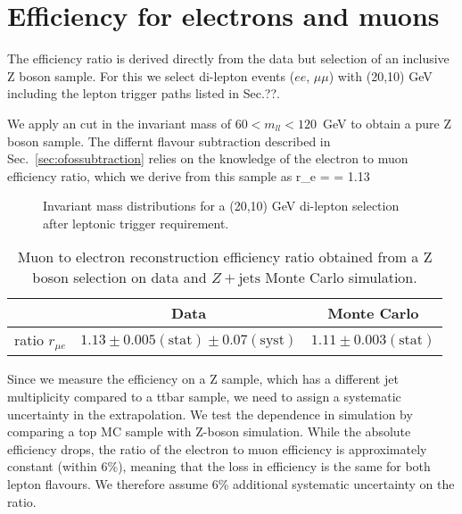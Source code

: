 \section{Efficiency for electrons and muons}\label{sec:eff}

The efficiency ratio is derived directly from the data
but selection of an inclusive Z boson sample.
For this we select di-lepton events ($ee$, $\mu\mu$) 
with (20,10) GeV including the lepton trigger paths
listed in Sec.??.

We apply an cut in the invariant mass of $60 < m_{ll} < 120$~GeV
to obtain a pure Z boson sample. The differnt flavour subtraction 
described in Sec.~\ref{sec:ofossubtraction} relies on the 
knowledge of the electron to muon efficiency ratio, which
we derive from this sample as
\be
    r_{\mu e} =  = 1.13 
\ee

\begin{figure}[hbtp]

  \hfill
  \hfill
  \caption{Invariant mass distributions for a (20,10) GeV di-lepton selection after leptonic 
      trigger requirement.\label{fig:Z_InvMass}}
\end{figure}


\begin{table}[htbp]
\begin{center}
\caption{\label{tab:tnp_eff}Muon to electron reconstruction efficiency ratio 
    obtained from a Z boson selection on data and $Z+\textrm{jets}$ Monte Carlo simulation.} 
\begin{tabular}{lcc}
\hline
            &  Data                                                 & Monte Carlo \\
\hline\hline
\hline
ratio $r_{\mu e}$       & $1.13 \pm 0.005 (\textrm{stat}) \pm 0.07 (\textrm{syst})$    & $1.11 \pm 0.003(\textrm{stat}) $ \\
\hline
\end{tabular}
\end{center}
\end{table}


Since we measure the efficiency on a Z sample, which has a different jet multiplicity
compared to a ttbar sample, we need to assign a systematic uncertainty in the extrapolation.
We test the dependence in simulation by comparing a top MC sample with Z-boson simulation.
While the absolute efficiency drops, the ratio of the electron to muon efficiency
is approximately constant (within $6\%$), meaning that the loss in efficiency is the same for both lepton
flavours. We therefore assume 6\% additional systematic uncertainty on the ratio.
